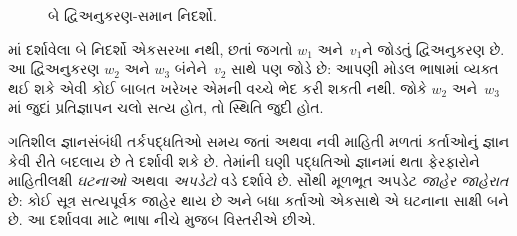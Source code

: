 \begin{figure}
  \begin{center}
  \end{center}
  \caption{બે દ્વિઅનુકરણ-સમાન નિદર્શો.}
\end{figure}

માં દર્શાવેલા બે નિદર્શો એકસરખા નથી,
છતાં જગતો $w_1$ અને~$v_1$ને જોડતું દ્વિઅનુકરણ છે. આ
દ્વિઅનુકરણ $w_2$ અને $w_3$ બંનેને~$v_2$ સાથે પણ જોડે છે:
આપણી મોડલ ભાષામાં વ્યક્ત થઈ શકે એવી કોઈ બાબત ખરેખર એમની
વચ્ચે ભેદ કરી શકતી નથી. જોકે $w_2$ અને~$w_3$માં જુદાં
પ્રતિજ્ઞાપન ચલો સત્ય હોત, તો સ્થિતિ જુદી હોત.
\endgroup

\begingroup
\makeatletter{}\makeatother


\label{guunit:OLP-0489}


ગતિશીલ જ્ઞાનસંબંધી તર્કપદ્ધતિઓ સમય જતાં અથવા નવી માહિતી મળતાં
કર્તાઓનું જ્ઞાન કેવી રીતે બદલાય છે તે દર્શાવી શકે છે. તેમાંની
ઘણી પદ્ધતિઓ જ્ઞાનમાં થતા ફેરફારોને માહિતીલક્ષી \emph{ઘટનાઓ}
અથવા \emph{અપડેટો} વડે દર્શાવે છે. સૌથી મૂળભૂત અપડેટ
\emph{જાહેર જાહેરાત} છે: કોઈ સૂત્ર સત્યપૂર્વક જાહેર થાય છે
અને બધા કર્તાઓ એકસાથે એ ઘટનાના સાક્ષી બને છે. આ દર્શાવવા
માટે ભાષા નીચે મુજબ વિસ્તરીએ છીએ.

